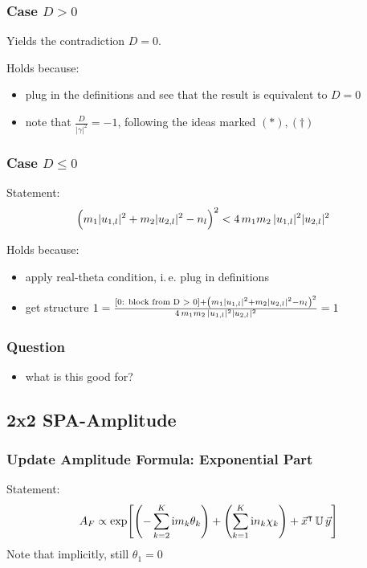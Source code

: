 \documentclass[
	english,
	a4paper,
	fontsize=10pt,
	parskip=half,
	titlepage=true,
	DIV=12,
	final
]{scrreprt}
\newcommand*{\ie}{i.\,e.\xspace}
\newcommand*{\transp}{\ensuremath{^\intercal}}
\newcommand*{\iunit}{\ensuremath{\mathrm{i}}}
\begin{document}
\subsubsection{Case $D > 0$}
Yields the contradiction $D = 0$.

Holds because:
\begin{itemize}
\item plug in the definitions and see that the result is equivalent to $D=0$
\item note that $\frac{D}{|\gamma|^{2}} = -1$, following the ideas marked $(*), (\dagger)$
\end{itemize}

\subsubsection{Case $D \leq 0$}
Statement:
\begin{align}
	\qty( \Big. m_1 |u_{1,l}|^{2} + m_2 |u_{2,l}|^{2} - n_l )^{2}
&<
	4 \, m_1 m_2 \, |u_{1,l}|^{2} |u_{2,l}|^{2}
\end{align}

Holds because:
\begin{itemize}
\item apply real-theta condition, \ie plug in definitions
\item get structure $1 = \frac{[\text{0: block from D > 0}] + 
	\qty( m_1 |u_{1,l}|^{2} + m_2 |u_{2,l}|^{2} - n_l )^{2}}
	{4 \, m_1 m_2 \, |u_{1,l}|^{2} |u_{2,l}|^{2}}
	=
	1$
\end{itemize}

\subsubsection{Question}
\begin{itemize}
\item {\color{red} what is this good for?}
\end{itemize}

\subsection{2x2 SPA-Amplitude}
\subsubsection{Update Amplitude Formula: Exponential Part}
Statement:
\begin{align}
	A_F
\propto
	\exp[ 
		\qty(- \sum_{k=2}^{K} \iunit m_k \theta_k) + 
		\qty(  \sum_{k=1}^{K} \iunit n_k \chi_k)   +
		\vec{x}\transp \, \mathbb{U} \, \vec{y}
	]
\end{align}
Note that implicitly, still $\theta_1 = 0$
\end{document}

